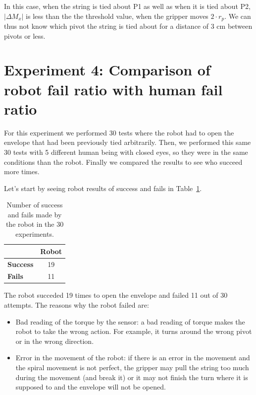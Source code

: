 In this case, when the string is tied about P1 as well as when it is tied about P2, $|\Delta M_{x}|$ is less than the the threshold value, when the gripper moves $2 \cdot r_{p}$. We can thus not know which pivot the string is tied about for a distance of 3 cm between pivots or less.

\section{Experiment 4: Comparison of robot fail ratio with human fail ratio}
For this experiment we performed 30 tests where the robot had to open the envelope that had been previously tied arbitrarily. Then, we performed this same 30 tests with 5 different human being with closed eyes, so they were in the same conditions than the robot. Finally we compared the results to see who succeed more times.

Let's start by seeing robot results of success and fails in Table~\ref{tab:exp4_robot}.
\begin{table}[htbp]
	\centering
	\begin{tabular}{|l|c|}
		\cmidrule{2-2}    \multicolumn{1}{r|}{} & \textbf{Robot} \\
		\midrule
		\textbf{Success} & 19 \\
		\midrule
		\textbf{Fails} & 11 \\
		\bottomrule
	\end{tabular}%
	\caption{Number of success and fails made by the robot in the 30 experiments.}
	\label{tab:exp4_robot}%
\end{table}%

The robot succeded 19 times to open the envelope and failed 11 out of 30 attempts. The reasons why the robot failed are:
\begin{itemize}
 \item Bad reading of the torque by the sensor: a bad reading of torque makes the robot to take the wrong action. For example, it turns around the wrong pivot or in the wrong direction.
 \item Error in the movement of the robot: if there is an error in the movement and the spiral movement is not perfect, the gripper may pull the string too much during the movement (and break it) or it may not finish the turn where it is supposed to and the envelope will not be opened.
\end{itemize}

